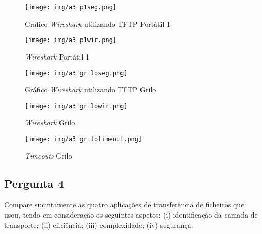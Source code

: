 \documentclass[runningheads]{llncs}
\begin{document}
    \pagebreak
    
    \begin{figure}[!ht]
    \centering
    \texttt{[image: img/a3 p1seg.png]}
    \caption{Gráfico \textit{Wireshark} utilizando TFTP Portátil 1} 
    \label{fig:data33}
    \end{figure}
    
    \begin{figure}[!ht]
    \centering
    \texttt{[image: img/a3 p1wir.png]}
    \caption{\textit{Wireshark} Portátil 1} 
    \label{fig:data34}
    \end{figure}
    
    \begin{figure}[!ht]
    \centering
    \texttt{[image: img/a3 griloseg.png]}
    \caption{Gráfico \textit{Wireshark} utilizando TFTP Grilo} 
    \label{fig:data34}
    \end{figure}
    
    \begin{figure}[!ht]
    \centering
    \texttt{[image: img/a3 grilowir.png]}
    \caption{\textit{Wireshark} Grilo} 
    \label{fig:data34}
    \end{figure}
    
    \begin{figure}[!ht]
    \centering
    \texttt{[image: img/a3 grilotimeout.png]}
    \caption{\textit{Timeouts} Grilo} 
    \label{fig:data34}
    \end{figure}
    
    \pagebreak
    \paragraph{}
    \paragraph{}
    \paragraph{}
    \paragraph{}
    \paragraph{}
    \subsection{Pergunta 4}
    Compare sucintamente as quatro aplicações de transferência de ficheiros que usou, tendo em consideração os seguintes aspetos: (i) identificação da camada de transporte; (ii) eficiência; (iii) complexidade; (iv) segurança.
    
\end{document}
